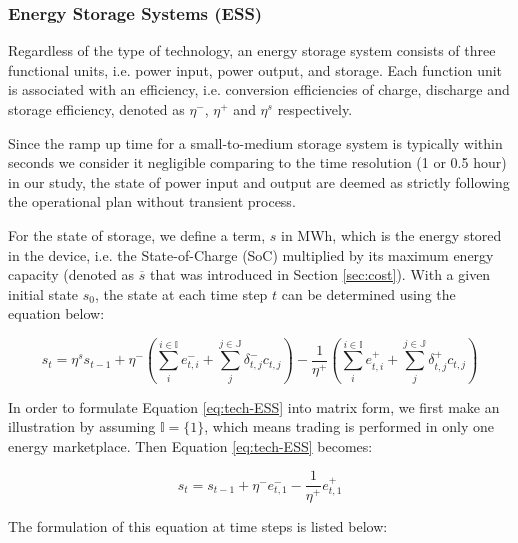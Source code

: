 \subsubsection{Energy Storage Systems (ESS)}
Regardless of the type of technology, an energy storage system consists of three functional units, i.e. power input, power output, and storage. Each function unit is associated with an efficiency, i.e. conversion efficiencies of charge, discharge and storage efficiency, denoted as $\eta^-$, $\eta^+$ and $\eta^s$ respectively.

Since the ramp up time for a small-to-medium storage system is typically within seconds \cite{Muller2016} we consider it negligible comparing to the time resolution (1 or 0.5 hour) in our study, the state of power input and output are deemed as strictly following the operational plan without transient process.

For the state of storage, we define a term, $s$ in MWh, which is the energy stored in the device, i.e. the State-of-Charge (SoC) multiplied by its maximum energy capacity (denoted as $\overline{s}$ that was introduced in Section \ref{sec:cost}). With a given initial state $s_0$, the state at each time step $t$ can be determined using the equation below:

\begin{equation}
\label{eq:tech-ESS}
s_t = \eta^s s_{t-1} + \eta^- (\sum_{i}^{i \in \mathbb{I}} e_{t,i}^{-} + \sum_{j}^{j \in \mathbb{J}}\delta_{t,j}^{-} c_{t,j})- \frac{1}{\eta^+} (\sum_{i}^{i \in \mathbb{I}} e_{t,i}^{+} + \sum_{j}^{j \in \mathbb{J}}\delta_{t,j}^{+}c_{t,j})
\end{equation}



In order to formulate Equation \eqref{eq:tech-ESS} into matrix form, we first make an illustration by assuming $\mathbb{I} = \{1\}$, which means trading is performed in only one energy marketplace. Then Equation \eqref{eq:tech-ESS} becomes:

\begin{equation}
\label{eq:tech-ESS-example}
s_t = s_{t-1} + \eta^- e_{t,1}^{-}  - \frac{1}{\eta^+} e_{t,1}^{+}
\end{equation}

The formulation of this equation at time steps is listed below:

